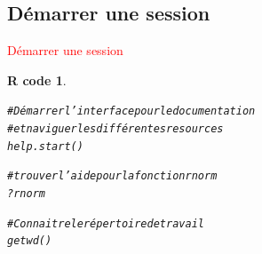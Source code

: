 \documentclass[11pt]{beamer}\usepackage[]{graphicx}\usepackage[]{color}
\makeatletter
\newcommand{\hlcom}[1]{\textcolor[rgb]{0.588,0.588,0.588}{#1}}%
\newcommand{\hlopt}[1]{\textcolor[rgb]{0.196,0.196,0.196}{#1}}%
\newcommand{\hlstd}[1]{\textcolor[rgb]{0.196,0.196,0.196}{#1}}%
\newcommand{\hlkwd}[1]{\textcolor[rgb]{0.78,0.227,0.412}{#1}}%
\newenvironment{kframe}{%
 \def\at@end@of@kframe{}%
 \ifinner\ifhmode%
  \def\at@end@of@kframe{\end{minipage}}%
  \begin{minipage}{\columnwidth}%
 \fi\fi%
 \def\FrameCommand##1{\hskip\@totalleftmargin \hskip-\fboxsep
 \colorbox{shadecolor}{##1}\hskip-\fboxsep
     \hskip-\linewidth \hskip-\@totalleftmargin \hskip\columnwidth}%
 \MakeFramed {\advance\hsize-\width
   \@totalleftmargin\z@ \linewidth\hsize
   \@setminipage}}%
 {\par\unskip\endMakeFramed%
 \at@end@of@kframe}
\newenvironment{knitrout}{}{} %
\newtheorem{rcode}{R code}[section]
\makeatother
\begin{document}








\subsection{D\'{e}marrer une session}

\begin{frame}
 \begin{center}
  \Huge{\textcolor{red}{D\'{e}marrer une session}}
 \end{center}
\end{frame}


\begingroup
\makeatletter
\setlength{\hoffset}{-.5\beamer@sidebarwidth}
\makeatother
\begin{frame}
\begin{knitrout}
\color{fgcolor}\begin{kframe}
\begin{rcode}\label{label}\begin{alltt}
\hlcom{# Démarrer l'interface pour le documentation}
\hlcom{# et naviguer les différentes resources}
\hlkwd{help.start}\hlstd{()}

\hlcom{# trouver l'aide pour la fonction rnorm}
\hlopt{?}\hlstd{rnorm}

\hlcom{# Connaitre le répertoire de travail}
\hlkwd{getwd}\hlstd{()}
\end{alltt}
\end{rcode}\end{kframe}
\end{knitrout}
\end{frame}

\end{document}
